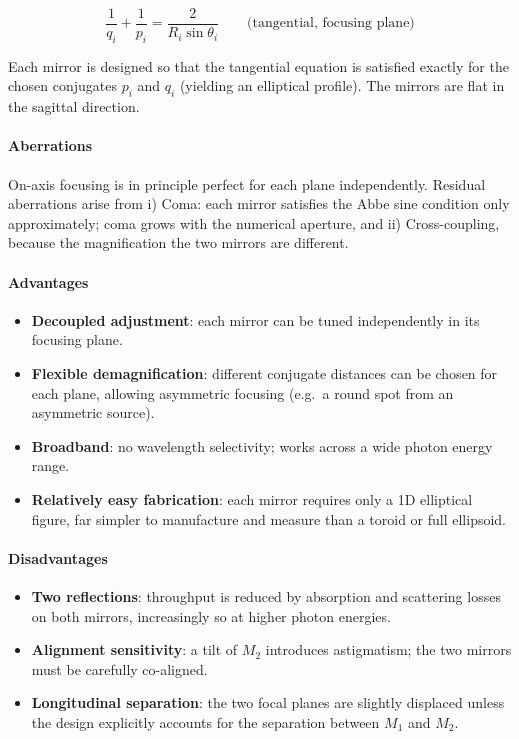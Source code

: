 \begin{equation}
    \frac{1}{q_i} + \frac{1}{p_i} = \frac{2}{R_i \sin\theta_i}
    \qquad \text{(tangential, focusing plane)} 
\end{equation}

\noindent
Each mirror is designed so that the tangential equation is satisfied exactly
for the chosen conjugates $p_i$ and $q_i$ (yielding an elliptical profile). The mirrors are flat in the sagittal direction.

\paragraph{Aberrations}

On-axis focusing is in principle perfect for each plane independently.
Residual aberrations arise from i) Coma: each mirror satisfies the Abbe sine condition only approximately; coma grows with the numerical aperture, and ii) Cross-coupling, because the magnification the two mirrors are different.



\paragraph{Advantages}

\begin{itemize}
    \item \textbf{Decoupled adjustment}: each mirror can be tuned independently
          in its focusing plane.
    \item \textbf{Flexible demagnification}: different conjugate distances can
          be chosen for each plane, allowing asymmetric focusing (e.g.\ a
          round spot from an asymmetric source).
    \item \textbf{Broadband}: no wavelength selectivity; works across a wide
          photon energy range.
    \item \textbf{Relatively easy fabrication}: each mirror requires only a
          1D elliptical figure, far simpler to manufacture and measure than a
          toroid or full ellipsoid.
\end{itemize}

\paragraph{Disadvantages}

\begin{itemize}
    \item \textbf{Two reflections}: throughput is reduced by absorption and
          scattering losses on both mirrors, increasingly so at higher
          photon energies.
    \item \textbf{Alignment sensitivity}: a tilt of $M_2$ introduces
          astigmatism; the two mirrors must be carefully co-aligned.
    \item \textbf{Longitudinal separation}: the two focal planes are slightly
          displaced unless the design explicitly accounts for the separation
          between $M_1$ and $M_2$.
\end{itemize}

